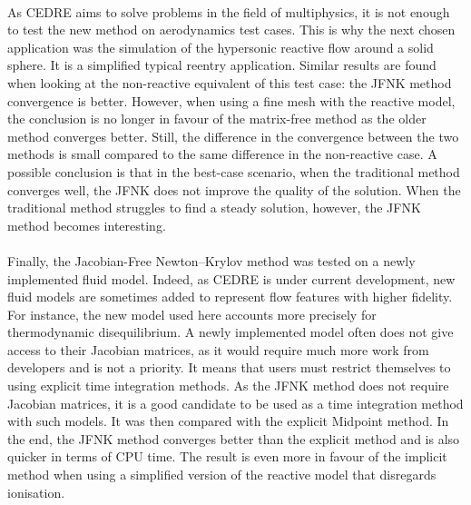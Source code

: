     \paragraph{}
    As CEDRE aims to solve problems in the field of multiphysics, it is not enough to test the new method on aerodynamics test cases.
    This is why the next chosen application was the simulation of the hypersonic reactive flow around a solid sphere.
    It is a simplified typical reentry application.
    Similar results are found when looking at the non-reactive equivalent of this test case: the JFNK method convergence is better.
    However, when using a fine mesh with the reactive model, the conclusion is no longer in favour of the matrix-free method as the older method converges better.
    Still, the difference in the convergence between the two methods is small compared to the same difference in the non-reactive case.
    A possible conclusion is that in the best-case scenario, when the traditional method converges well, the JFNK does not improve the quality of the solution.
    When the traditional method struggles to find a steady solution, however, the JFNK method becomes interesting.

    \paragraph{}
    Finally, the Jacobian-Free Newton--Krylov method was tested on a newly implemented fluid model.
    Indeed, as CEDRE is under current development, new fluid models are sometimes added to represent flow features with higher fidelity.
    For instance, the new model used here accounts more precisely for thermodynamic disequilibrium.
    A newly implemented model often does not give access to their Jacobian matrices, as it would require much more work from developers and is not a priority.
    It means that users must restrict themselves to using explicit time integration methods.
    As the JFNK method does not require Jacobian matrices, it is a good candidate to be used as a time integration method with such models.
    It was then compared with the explicit Midpoint method.
    In the end, the JFNK method converges better than the explicit method and is also quicker in terms of CPU time.
    The result is even more in favour of the implicit method when using a simplified version of the reactive model that disregards ionisation.

